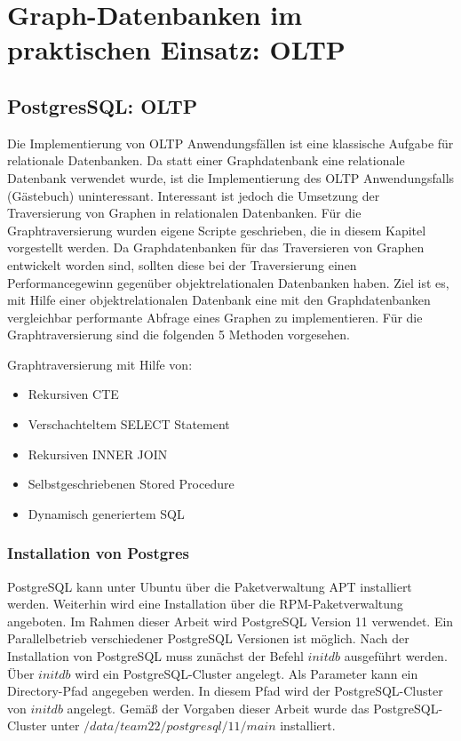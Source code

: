 \chapter{Graph-Datenbanken im praktischen Einsatz: \ac{OLTP}}
\section{PostgresSQL: OLTP}
Die Implementierung von OLTP Anwendungsfällen ist eine klassische Aufgabe für relationale Datenbanken.
Da statt einer Graphdatenbank eine relationale Datenbank verwendet wurde, ist die Implementierung des OLTP Anwendungsfalls (Gästebuch) uninteressant.
Interessant ist jedoch die Umsetzung der Traversierung von Graphen in relationalen Datenbanken.
Für die Graphtraversierung wurden eigene Scripte geschrieben, die in diesem Kapitel vorgestellt werden.
Da Graphdatenbanken für das Traversieren von Graphen entwickelt worden sind, sollten diese bei der Traversierung einen Performancegewinn gegenüber objektrelationalen Datenbanken haben.
Ziel ist es, mit Hilfe einer objektrelationalen Datenbank eine mit den Graphdatenbanken vergleichbar performante Abfrage eines Graphen zu implementieren.
Für die Graphtraversierung sind die folgenden 5 Methoden vorgesehen.

Graphtraversierung mit Hilfe von:
\begin{itemize}
    \item Rekursiven \ac{CTE}
    \item Verschachteltem SELECT Statement
    \item Rekursiven INNER JOIN
    \item Selbstgeschriebenen Stored Procedure
    \item Dynamisch generiertem \ac{SQL}
\end{itemize}
\subsection{Installation von Postgres}
PostgreSQL kann unter Ubuntu über die Paketverwaltung \ac{APT} installiert werden.
Weiterhin wird eine Installation über die \ac{RPM}-Paketverwaltung angeboten.
Im Rahmen dieser Arbeit wird PostgreSQL Version 11 verwendet.
Ein Parallelbetrieb verschiedener PostgreSQL Versionen ist möglich.
Nach der Installation von PostgreSQL muss zunächst der Befehl $initdb$ ausgeführt werden.
Über $initdb$ wird ein PostgreSQL-Cluster angelegt.
Als Parameter kann ein Directory-Pfad angegeben werden.
In diesem Pfad wird der PostgreSQL-Cluster von $initdb$ angelegt.
Gemäß der Vorgaben dieser Arbeit wurde das PostgreSQL-Cluster unter $/data/team22/postgresql/11/main$ installiert.
